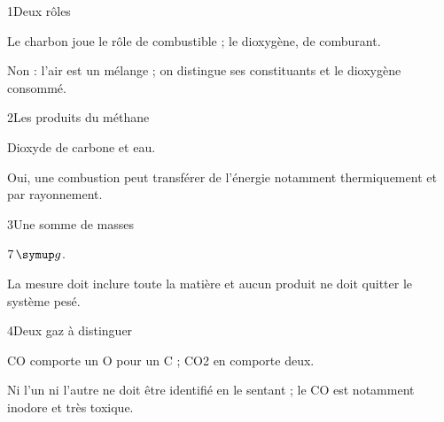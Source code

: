 \par\noindent\begin{minipage}{\linewidth}
\begin{corrige}{1}{Deux rôles}
\begin{questions}
\item Le charbon joue le rôle de combustible ; le dioxygène, de comburant.
\item Non : l’air est un mélange ; on distingue ses constituants et le dioxygène consommé.
\end{questions}
\end{corrige}
\end{minipage}
\par\noindent\begin{minipage}{\linewidth}
\begin{corrige}{2}{Les produits du méthane}
\begin{questions}
\item Dioxyde de carbone et eau.
\item Oui, une combustion peut transférer de l’énergie notamment thermiquement et par rayonnement.
\end{questions}
\end{corrige}
\end{minipage}
\par\noindent\begin{minipage}{\linewidth}
\begin{corrige}{3}{Une somme de masses}
\begin{questions}
\item $7\unite g$.
\item La mesure doit inclure toute la matière et aucun produit ne doit quitter le système pesé.
\end{questions}
\end{corrige}
\end{minipage}
\par\noindent\begin{minipage}{\linewidth}
\begin{corrige}{4}{Deux gaz à distinguer}
\begin{questions}
\item CO comporte un O pour un C ; CO2 en comporte deux.
\item Ni l’un ni l’autre ne doit être identifié en le sentant ; le CO est notamment inodore et très toxique.
\end{questions}
\end{corrige}
\end{minipage}
